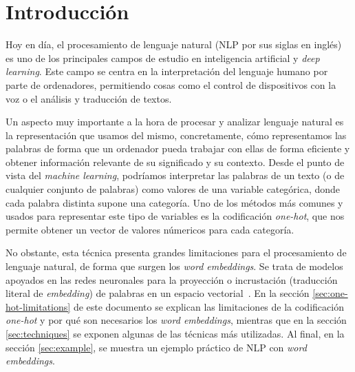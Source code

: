 \section{Introducción}

Hoy en día, el procesamiento de lenguaje natural (NLP por sus siglas en inglés)
es uno de los principales campos de estudio en inteligencia artificial y
\textit{deep learning}. Este campo se centra en la interpretación del lenguaje
humano por parte de ordenadores, permitiendo cosas como el control de
dispositivos con la voz o el análisis y traducción de textos.

Un aspecto muy importante a la hora de procesar y analizar lenguaje natural es
la representación que usamos del mismo, concretamente, cómo representamos las
palabras de forma que un ordenador pueda trabajar con ellas de forma eficiente y
obtener información relevante de su significado y su contexto. Desde el punto de
vista del \textit{machine learning}, podríamos interpretar las palabras de un
texto (o de cualquier conjunto de palabras) como valores de una variable
categórica, donde cada palabra distinta supone una categoría. Uno de los métodos
más comunes y usados para representar este tipo de variables es la codificación
\textit{one-hot}, que nos permite obtener un vector de valores númericos para
cada categoría.

No obstante, esta técnica presenta grandes limitaciones para el procesamiento de
lenguaje natural, de forma que surgen los \textit{word embeddings}. Se trata de
modelos apoyados en las redes neuronales para la proyección o incrustación
(traducción literal de \textit{embedding}) de palabras en un espacio
vectorial~\cite{definition}. En la sección \ref{sec:one-hot-limitations} de este
documento se explican las limitaciones de la codificación \textit{one-hot} y
por qué son necesarios los \textit{word embeddings}, mientras que en la sección
\ref{sec:techniques} se exponen algunas de las técnicas más utilizadas. Al
final, en la sección \ref{sec:example}, se muestra un ejemplo práctico de NLP
con \textit{word embeddings}.

